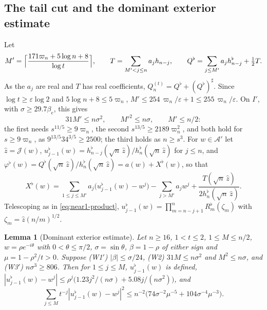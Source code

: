 \documentclass[11pt]{amsart}
\newtheorem{lemma}[theorem]{Lemma}
\theoremstyle{definition}
\theoremstyle{remark}
\numberwithin{equation}{section}
\newcommand{\eps}{\varepsilon}
\begin{document}
\subsection{The tail cut and the dominant exterior estimate}
Let
\[
M'=\Bigl\lceil\frac{171\varpi_n+5\log n+8}{\log t}\Bigr\rceil,\qquad T=\sum_{M'<j\le n}a_jh_{n-j},\qquad Q^\flat=\sum_{j\le M'}a_jh_{n-j}^\flat+\tfrac12T .
\]
As the $a_j$ are real and $T$ has real coefficients, $Q_n^{(t)}=Q^\flat+(Q^\flat)^\sharp$. Since $\log t\ge\eps\log2$ and $5\log n+8\le5\varpi_n$, $M'\le254\,\varpi_n/\eps+1\le255\,\varpi_n/\eps$. On $I'$, with $\sigma\ge29.7\beta_e$, this gives
\begin{equation}\label{eq:near1-W2bulk}
31M'\le n\sigma^2,\qquad M'^2\le n\sigma,\qquad M'\le n/2:
\end{equation}
the first needs $s^{11/5}\ge9\varpi_n$, the second $s^{13/5}\ge2189\varpi_n^2$, and both hold for $s\ge9\varpi_n$, as $9^{13/5}34^{3/5}\ge2500$; the third holds as $n\ge s^3$. For $w\in\mathcal A'$ let $\hat z=\mathcal J(w)$, $u_{j-1}^\flat(w)=h_{n-j}^\flat(\sqrt n\,\hat z)/h_n^\flat(\sqrt n\,\hat z)$ for $j\le n$, and $\varphi^\flat(w)=Q^\flat(\sqrt n\,\hat z)/h_n^\flat(\sqrt n\,\hat z)=a(w)+X^\flat(w)$, so that
\begin{equation}\label{eq:near1-Xflat}
X^\flat(w)=\sum_{1\le j\le M'}a_j\bigl(u_{j-1}^\flat(w)-w^j\bigr)-\sum_{j>M'}a_jw^j+\frac{T(\sqrt n\,\hat z)}{2h_n^\flat(\sqrt n\,\hat z)} .
\end{equation}
Telescoping as in \eqref{eq:near1-product}, $u_{j-1}^\flat(w)=\prod_{m=n-j+1}^nR_m^\flat(\zeta_m)$ with $\zeta_m=\hat z(n/m)^{1/2}$.

\begin{lemma}[Dominant exterior estimate]\label{lem:near1-domext}
Let $n\ge16$, $1<t\le2$, $1\le M\le n/2$, $w=\rho e^{-i\theta}$ with $0<\theta\le\pi/2$, $\sigma=\sin\theta$, $\beta=1-\rho$ of either sign and $\mu=1-\rho^2/t>0$. Suppose (W1$'$) $|\beta|\le\sigma/24$, (W2) $31M\le n\sigma^2$ and $M^2\le n\sigma$, and (W3$'$) $n\sigma^3\ge806$. Then for $1\le j\le M$, $u_{j-1}^\flat(w)$ is defined, $|u_{j-1}^\flat(w)-w^j|\le\rho^j\bigl(1.23j^2/(n\sigma)+5.08j/(n\sigma^2)\bigr)$, and
\[
\sum_{j\le M}t^{-j}|u_{j-1}^\flat(w)-w^j|^2\le n^{-2}\bigl(74\sigma^{-2}\mu^{-5}+104\sigma^{-4}\mu^{-3}\bigr).
\]
\end{lemma}
\end{document}
